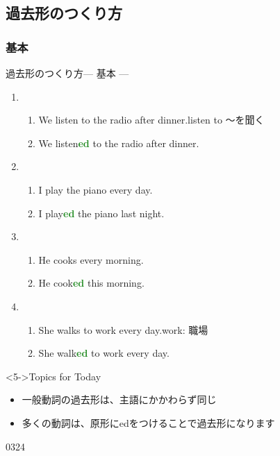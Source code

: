 \documentclass[aspectratio=169,xcolor={dvipsnames,table}]{beamer}
\newcommand{\myaudio}[1]{\href{#1}{\faVolumeUp}}
\begin{document}
\subsection{過去形のつくり方}
\subsubsection{基本}
\begin{frame}[plain]{過去形のつくり方--- 基本 ---}
 
\begin{enumerate}
 \item<1-> \begin{enumerate}
	\item We listen to the radio after dinner.\hfill{\scriptsize listen to ～を聞く\,}
	\item We listen\textcolor{ForestGreen}{\bfseries ed} to the radio after dinner.
       \end{enumerate}
 \item<2-> \begin{enumerate}
	\item I play the piano every day.
	\item I play\textcolor{ForestGreen}{\bfseries ed} the piano last night.
       \end{enumerate}
 \item<3-> \begin{enumerate}
	\item He cooks every morning.
	\item He cook\textcolor{ForestGreen}{\bfseries ed} this morning.
       \end{enumerate}

 \item<4-> \begin{enumerate}
	\item She walks to work every day.\hfill{}{\scriptsize work: 職場}
	\item She walk\textcolor{ForestGreen}{\bfseries ed} to work every day.
       \end{enumerate}
\end{enumerate}

\begin{block}<5->{Topics for Today}\small
\begin{itemize}[square]
 \item 一般動詞の過去形は、主語にかかわらず同じ
 \item 多くの動詞は、原形にedをつけることで過去形になります
\end{itemize}
\end{block}
\hfill{\tiny 0324}\,{\scriptsize \myaudio{./audio/025_past_do_02.mp3}}

\end{frame}
\end{document}
